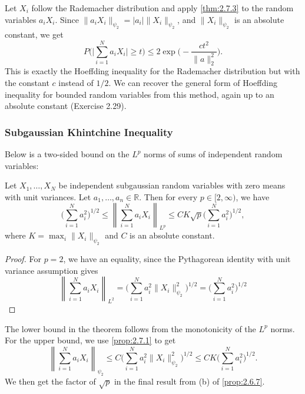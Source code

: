\begin{example}
\label{ex:2.7.4}
Let $X_i$ follow the Rademacher distribution and apply \cref{thm:2.7.3} to the random variables 
$a_i X_i$. Since $\lVert a_i X_i \rVert_{\psi_2} = |a_i| \lVert X_i \rVert_{\psi_2}$, 
and $\lVert X_i \rVert_{\psi_2}$ is an absolute 
constant, we get 
\[  P \biggl( \bigg| \sum_{i = 1}^{N} a_iX_i \bigg| \geq t \biggr) 
\leq 2\exp{\biggl( -\frac{ct^2}{\lVert a \rVert_2^2} \biggr)}. \]
This is exactly the Hoeffding inequality for the Rademacher distribution but with the constant $c$ instead 
of $1/2$. We can recover the general form of Hoeffding inequality for bounded random variables from this 
method, again up to an absolute constant (Exercise 2.29).
\end{example}


\subsubsection{Subgaussian Khintchine Inequality}
Below is a two-sided bound on the $L^p$ norms of sums of independent random variables:
\begin{theorem}
\label{thm:2.7.5}
Let $X_1, \dots, X_N$ be independent subgaussian random variables with zero means with unit variances. 
Let $a_1, \dots, a_n \in \mathbb{R}$. Then for every $p \in [2, \infty)$, we have 
\[ \biggl( \sum_{i = 1}^{N} a_i^2 \biggr)^{1/2} \leq 
\left\lVert \sum_{i = 1}^{N} a_i X_i \right\rVert_{L^p} \leq 
CK \sqrt{p}\biggl( \sum_{i = 1}^{N} a_i^2 \biggr)^{1/2}, \]
where $K = \max_{i} \lVert X_i \rVert_{\psi_2}$ and $C$ is an absolute constant.
\end{theorem}

\begin{proof}
For $p = 2$, we have an equality, since the Pythagorean identity with unit variance assumption gives 
\[ \left\lVert \sum_{i = 1}^{N} a_i X_i \right\rVert_{L^2} 
= \biggl( \sum_{i = 1}^{N} a_i^2 \lVert X_i \rVert_{\psi_2}^2 \biggr)^{1/2} 
= \biggl( \sum_{i = 1}^{N} a_i^2 \biggr)^{1/2} \]
\end{proof}
The lower bound in the theorem follows from the monotonicity of the $L^p$ norms. For the upper bound, 
we use \cref{prop:2.7.1} to get 
\[ \left\lVert \sum_{i = 1}^{N} a_i X_i \right\rVert_{\psi_2} 
\leq C \biggl( \sum_{i = 1}^{N} a_i^2 \lVert X_i \rVert_{\psi_2}^2 \biggr)^{1/2} 
\leq CK \biggl( \sum_{i = 1}^{N} a_i^2 \biggr)^{1/2}. \]
We then get the factor of $\sqrt{p}$ in the final result from (b) of \cref{prop:2.6.7}.


